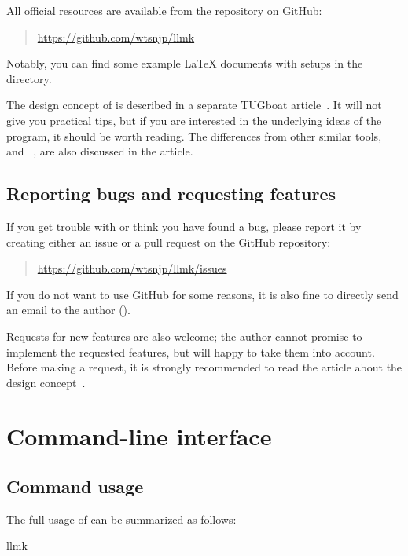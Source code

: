 \documentclass[draft]{llmk-doc}
\begin{document}
\begin{samepage}
All official resources are available from the repository on GitHub:
%
\begin{quote}
\url{https://github.com/wtsnjp/llmk}
\end{quote}
%
Notably, you can find some example {\LaTeX} documents with  setups
in the \href{https://github.com/wtsnjp/llmk/tree/master/examples}
{} directory.
\end{samepage}

The design concept of  is described in a separate TUGboat
article~\cite{asakura2020}. It will not give you practical tips, but if you are
interested in the underlying ideas of the program, it should be worth reading.
The differences from other similar tools, \eg{}~\cite{latexmk} and
~\cite{arara}, are also discussed in the article.

\subsection{Reporting bugs and requesting features}

If you get trouble with  or think you have found a bug, please
report it by creating either an issue or a pull request on the GitHub
repository:
%
\begin{quote}
\url{https://github.com/wtsnjp/llmk/issues}
\end{quote}
%
If you do not want to use GitHub for some reasons, it is also fine to directly
send an email to the author ().

Requests for new features are also welcome; the author cannot promise to
implement the requested features, but will happy to take them into account.
Before making a request, it is strongly recommended to read the article about
the design concept~\cite{asakura2020}.

\section{Command-line interface}

\subsection{Command usage}
\label{sec:command}

The full usage of  can be summarized as follows:
%
\begin{htcode}
llmk  
\end{htcode}
\end{document}

